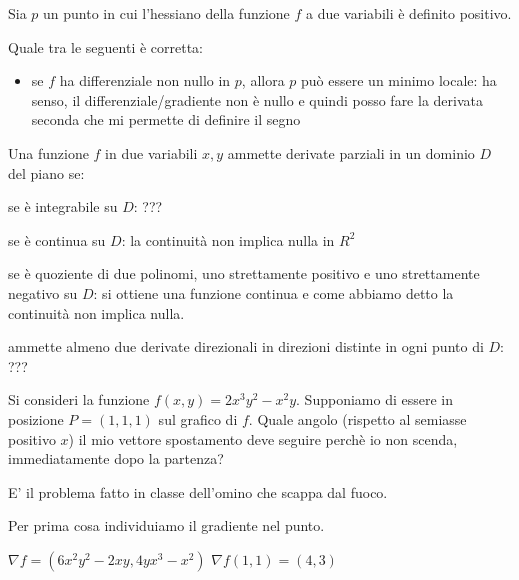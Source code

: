 
\begin{domanda}
Sia $p$ un punto in cui l'hessiano della funzione $f$  a due variabili è definito positivo.

Quale tra le seguenti è corretta:
\begin{itemize}
\item se $f$ ha differenziale non nullo in $p$, allora $p$ può essere un minimo locale: ha senso, il differenziale/gradiente non è nullo e quindi posso fare la derivata seconda che mi permette di definire il segno
\end{itemize}

\end{domanda}

\begin{domanda}
Una funzione $f$ in due variabili $x,y$ ammette derivate parziali in un dominio $D$ del piano se:

\item se è integrabile su $D$: ???
\item se è continua su $D$: la continuità non implica nulla in $R^2$
\item se è quoziente di due polinomi, uno strettamente positivo e uno strettamente negativo su $D$: si ottiene una funzione continua e come abbiamo detto la continuità non implica nulla.
\item ammette almeno due derivate direzionali in direzioni distinte in ogni punto di $D$: ??? 
\end{domanda}

\begin{domanda}
Si consideri la funzione $f(x,y)=2x^3y^2-x^2y$. Supponiamo di essere in posizione $P=(1,1,1)$ sul grafico di $f$. Quale angolo (rispetto al semiasse positivo $x$) il mio vettore spostamento deve seguire perchè io non scenda, immediatamente dopo la partenza?

E' il problema fatto in classe dell'omino che scappa dal fuoco.

Per prima cosa individuiamo il gradiente nel punto.

$\nabla f = (6x^2y^2-2xy,4yx^3-x^2)$
$\nabla f(1,1) = (4,3)$

    
\end{domanda}